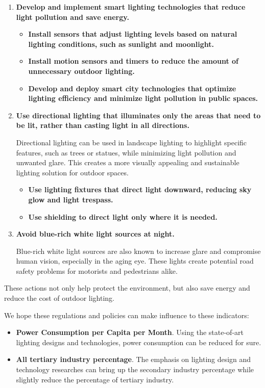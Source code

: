 \begin{enumerate}
    
    \item \textbf{Develop and implement smart lighting technologies that reduce light pollution and save energy.}
    \begin{itemize}
        \item \textbf{Install sensors that adjust lighting levels based on natural lighting conditions, such as sunlight and moonlight. }
        \item \textbf{Install motion sensors and timers to reduce the amount of unnecessary outdoor lighting.}
        
        \item \textbf{Develop and deploy smart city technologies that optimize lighting efficiency and minimize light pollution in public spaces.}
    \end{itemize}

    \item \textbf{Use directional lighting that illuminates only the areas that need to be lit, rather than casting light in all directions.}

    Directional lighting can be used in landscape lighting to highlight specific features, such as trees or statues, while minimizing light pollution and unwanted glare. This creates a more visually appealing and sustainable lighting solution for outdoor spaces.

    \begin{itemize}
        \item \textbf{Use lighting fixtures that direct light downward, reducing sky glow and light trespass.}
        \item \textbf{Use shielding to direct light only where it is needed.}
    \end{itemize}

    \item \textbf{Avoid blue-rich white light sources at night. }

    Blue-rich white light sources are also known to increase glare and compromise human vision, especially in the aging eye. These lights create potential road safety problems for motorists and pedestrians alike.

\end{enumerate}

These actions not only help protect the environment, but also save energy and reduce the cost of outdoor lighting.

We hope these regulations and policies can make influence to these indicators:
\begin{itemize}
    \item \textbf{Power Consumption per Capita per Month}. Using the state-of-art lighting designs and technologies, power consumption can be reduced for sure.
    \item \textbf{All tertiary industry percentage}. The emphasis on lighting design and technology researches can bring up the secondary industry percentage while slightly reduce the percentage of tertiary industry.
\end{itemize}

